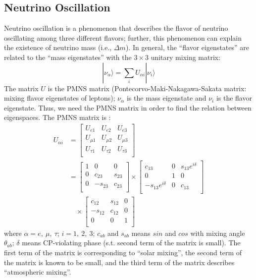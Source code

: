 \documentclass[12pt]{article}
\begin{document}
\begin{multicols}{2}
    \subsection{Neutrino Oscillation}
        Neutrino oscillation is a phenomenon that describes the flavor of neutrino oscillating among three different flavors; further, this phenomenon can explain the existence of neutrino mass (i.e., $\Delta m$). In general, the ``flavor eigenstates'' are related to the ``mass eigenstates'' with the $3 \times 3$ unitary mixing matrix:
        \[
            | \nu_{\alpha} \rangle = \sum_{i} U_{\alpha i} | \nu_{i} \rangle
        \]
        The matrix $U$ is the PMNS matrix (Pontecorvo-Maki-Nakagawa-Sakata matrix: mixing flavor eigenstates of leptons); $\nu_\alpha$ is the mass eigenstate and $\nu_i$ is the flavor eigenstate. Thus, we need the PMNS matrix in order to find the relation between eigenspaces. The PMNS matrix is \cite{SKexp} \cite{AtoNeu}:
        \begin{align*}
            U_{\alpha i} &= 
            \begin{bmatrix}
                U_{e1}     & U_{e2}     & U_{e3}    \\
                U_{\mu 1}  & U_{\mu 2}  & U_{\mu 3} \\
                U_{\tau 1} & U_{\tau 2} & U_{\tau 3}\\
            \end{bmatrix}\\
            &=
            \begin{bmatrix}
                1 & 0       & 0     \\
                0 & c_{23}  & s_{23}\\
                0 & -s_{23} & c_{23}\\
            \end{bmatrix}
            \times
            \begin{bmatrix}
                c_{13}             & 0 & s_{13}e^{i\delta}\\
                0                  & 1 & 0                \\
                -s_{13}e^{i\delta} & 0 & c_{13}           \\
            \end{bmatrix}\\
            &\quad \mathbin \times
            \begin{bmatrix}
                c_{12}  & s_{12} & 0\\
                -s_{12} & c_{12} & 0\\
                0       & 0      & 1\\
            \end{bmatrix}
        \end{align*}
        where $\alpha = e,\ \mu,\ \tau$; $i = 1,\ 2,\ 3$; $c_{ab}$ and $s_{ab}$ means $sin$ and $cos$ with mixing angle $\theta_{ab}$; $\delta$ means CP-violating phase (s.t. second term of the matrix is small). The first term of the matrix is corresponding to ``solar mixing'', the second term of the matrix is known to be small, and the third term of the matrix describes ``atmospheric mixing''.


\end{multicols}
\end{document}
